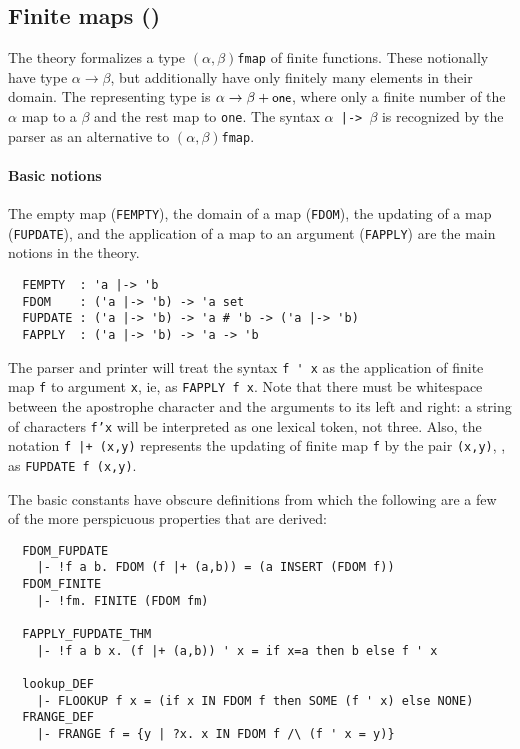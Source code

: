 \subsection{Finite maps ()}\label{finite_map}

The theory  formalizes a type
$(\alpha,\beta)$\verb+fmap+ of finite functions. These notionally have
type $\alpha\to\beta$, but additionally have only finitely many
elements in their domain. The representing type is $\alpha\to\beta +
\mbox{\small{\textbf{\sf{one}}}}$, where only a finite number of the $\alpha$ map to a
$\beta$ and the rest map to \verb+one+. The syntax
$\alpha$\verb+ |-> +$\beta$ is recognized by the parser as an
alternative to $(\alpha,\beta)$\verb+fmap+.

\paragraph {Basic notions}

The empty map ({\small\verb+FEMPTY+}), the domain of a map
({\small\verb+FDOM+}), the updating of a map
({\small\verb+FUPDATE+}), and the application of a map to an argument
({\small\verb+FAPPLY+}) are the main notions in the theory.
%
{\small
\begin{verbatim}
  FEMPTY  : 'a |-> 'b
  FDOM    : ('a |-> 'b) -> 'a set
  FUPDATE : ('a |-> 'b) -> 'a # 'b -> ('a |-> 'b)
  FAPPLY  : ('a |-> 'b) -> 'a -> 'b
\end{verbatim}}

The \HOL{} parser and printer will treat the syntax \verb+f ' x+ as
the application of finite map \verb+f+ to argument \verb+x+, ie, as
\verb+FAPPLY f x+. Note that there must be whitespace between the
apostrophe character and the arguments to its left and right: a string
of characters \texttt{f'x} will be interpreted as one lexical token,
not three. Also, the notation \verb#f |+ (x,y)#
represents the updating of finite map \verb+f+ by the pair
\verb+(x,y)+, \ie, as \verb+FUPDATE f (x,y)+.

The basic constants have obscure definitions from which the following
are a few of the more perspicuous properties that are derived:
%
{\small
\begin{verbatim}
  FDOM_FUPDATE
    |- !f a b. FDOM (f |+ (a,b)) = (a INSERT (FDOM f))
  FDOM_FINITE
    |- !fm. FINITE (FDOM fm)

  FAPPLY_FUPDATE_THM
    |- !f a b x. (f |+ (a,b)) ' x = if x=a then b else f ' x

  lookup_DEF
    |- FLOOKUP f x = (if x IN FDOM f then SOME (f ' x) else NONE)
  FRANGE_DEF
    |- FRANGE f = {y | ?x. x IN FDOM f /\ (f ' x = y)}
\end{verbatim}
}

